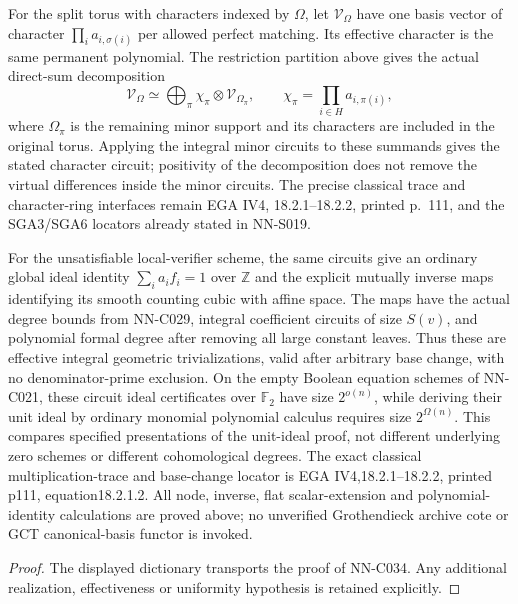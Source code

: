 \begin{geometricstatement}[NN-C034]
For the split torus with characters indexed by $\Omega$,
let $\mathcal V_\Omega$ have one basis vector of character
$\prod_i a_{i,\sigma(i)}$ per allowed perfect matching.
Its effective character is the same permanent polynomial.
The restriction partition above gives the actual direct-sum
decomposition
\[
 \mathcal V_\Omega\simeq
  \bigoplus_{\pi}
    \chi_\pi\otimes\mathcal V_{\Omega_\pi},
 \qquad \chi_\pi=\prod_{i\in H}a_{i,\pi(i)},
\]
where $\Omega_\pi$ is the remaining minor support and its
characters are included in the original torus.  Applying
the integral minor circuits to these summands gives the
stated character circuit; positivity of the decomposition
does not remove the virtual differences inside the minor
circuits.  The precise classical trace and character-ring
interfaces remain EGA IV4, 18.2.1--18.2.2, printed p.~111,
and the SGA3/SGA6 locators already stated in NN-S019.

For the unsatisfiable local-verifier scheme, the same circuits give an ordinary global ideal identity $\sum_i a_if_i=1$ over $\mathbb Z$ and the explicit mutually inverse maps identifying its smooth counting cubic with affine space. The maps have the actual degree bounds from NN-C029, integral coefficient circuits of size $S(v)$, and polynomial formal degree after removing all large constant leaves. Thus these are effective integral geometric trivializations, valid after arbitrary base change, with no denominator-prime exclusion. On the empty Boolean equation schemes of NN-C021, these circuit ideal certificates over $\mathbb F_2$ have size $2^{o(n)}$, while deriving their unit ideal by ordinary monomial polynomial calculus requires size $2^{\Omega(n)}$. This compares specified presentations of the unit-ideal proof, not different underlying zero schemes or different cohomological degrees. The exact classical multiplication-trace and base-change locator is EGA IV4,18.2.1--18.2.2, printed p111, equation18.2.1.2. All node, inverse, flat scalar-extension and polynomial-identity calculations are proved above; no unverified Grothendieck archive cote or GCT canonical-basis functor is invoked.
\end{geometricstatement}
\begin{proof} The displayed dictionary transports the proof of NN-C034. Any additional realization, effectiveness or uniformity hypothesis is retained explicitly.\end{proof}


